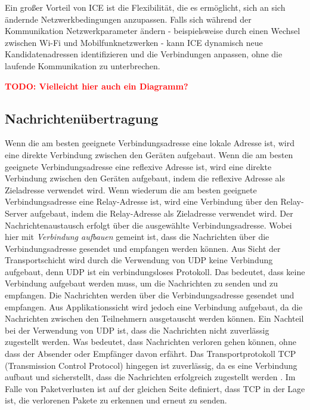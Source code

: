 Ein großer Vorteil von ICE ist die Flexibilität, die es ermöglicht, sich an sich ändernde Netzwerkbedingungen anzupassen. Falls sich während der Kommunikation Netzwerkparameter ändern - beispielsweise durch einen Wechsel zwischen Wi-Fi und Mobilfunknetzwerken - kann ICE dynamisch neue Kandidatenadressen identifizieren und die Verbindungen anpassen, ohne die laufende Kommunikation zu unterbrechen.

\textbf{\textcolor{red}{TODO: Vielleicht hier auch ein Diagramm?}}

\subsection{Nachrichtenübertragung}

Wenn die am besten geeignete Verbindungsadresse eine lokale Adresse ist, wird eine direkte Verbindung zwischen den Geräten aufgebaut. Wenn die am besten geeignete Verbindungsadresse eine reflexive Adresse ist, wird eine direkte Verbindung zwischen den Geräten aufgebaut, indem die reflexive Adresse als Zieladresse verwendet wird. Wenn wiederum die am besten geeignete Verbindungsadresse eine Relay-Adresse ist, wird eine Verbindung über den Relay-Server aufgebaut, indem die Relay-Adresse als Zieladresse verwendet wird. Der Nachrichtenaustausch erfolgt über die ausgewählte Verbindungsadresse. Wobei hier mit \textit{Verbindung aufbauen} gemeint ist, dass die Nachrichten über die Verbindungsadresse gesendet und empfangen werden können. Aus Sicht der Transportschicht wird durch die Verwendung von UDP keine Verbindung aufgebaut, denn UDP ist ein verbindungsloses Protokoll. Das bedeutet, dass keine Verbindung aufgebaut werden muss, um die Nachrichten zu senden und zu empfangen. Die Nachrichten werden über die Verbindungsadresse gesendet und empfangen. Aus Applikationssicht wird jedoch eine Verbindung aufgebaut, da die Nachrichten zwischen den Teilnehmern ausgetauscht werden können.
Ein Nachteil bei der Verwendung von UDP ist, dass die Nachrichten nicht zuverlässig zugestellt werden. Was bedeutet, dass Nachrichten verloren gehen können, ohne dass der Absender oder Empfänger davon erfährt. Das Transportprotokoll TCP (Transmission Control Protocol) hingegen ist zuverlässig, da es eine Verbindung aufbaut und sicherstellt, dass die Nachrichten erfolgreich zugestellt werden \parencite[S. 36]{rfc9293_TCP}. Im Falle von Paketverlusten ist auf der gleichen Seite definiert, dass TCP in der Lage ist, die verlorenen Pakete zu erkennen und erneut zu senden.
